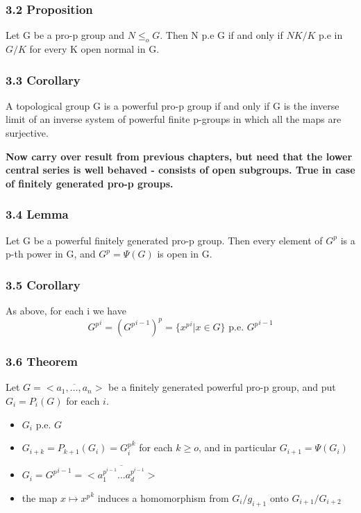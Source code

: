 \subsubsection*{3.2 Proposition}
Let G be a pro-p group and $N\leq_o G$. Then N p.e G if and only if $NK/K$ p.e in $G/K$ for every K open normal in G.

\subsubsection*{3.3 Corollary}
A topological group G is a powerful pro-p group if and only if G is the inverse limit of an inverse system of powerful finite p-groups in which all the maps are surjective.

\textbf{Now carry over result from previous chapters, but need that the lower central series is well behaved - consists of open subgroups. True in case of finitely generated pro-p groups.}

\subsubsection*{3.4 Lemma}
Let G be a powerful finitely generated pro-p group. Then every element of $G^p$ is a p-th power in G, and $G^p = \Psi (G)$ is open in G.

\subsubsection*{3.5 Corollary}
As above, for each i we have
$${G^p}^i = ({G^p}^{i-1})^p = \{{x^p}^i | x\in G\} \text{ p.e. } {G^p}^{i-1}$$

\subsubsection*{3.6 Theorem}
Let $G=\overline{<a_1, \dots , a_n>}$ be a finitely generated powerful pro-p group, and put $G_i = P_i(G)$ for each $i$.
\begin{itemize}
\item $G_i$ p.e. $G$
\item $G_{i+k} = P_{k+1}(G_i) = {G_i^p}^k$ for each $k\geq o$, and in particular $G_{i+1} = \Psi(G_i)$
\item  $G_{i} = {G^p}^{i-1} = \overline{<a_1^{p^{i-1}}\dots a_d^{p^{i-1}}>}$
\item the map $x \mapsto {x^p}^k$ induces a homomorphism from   $G_i/g_{i+1}$ onto $G_{i+1}/G_{i+2}$
\end{itemize}

